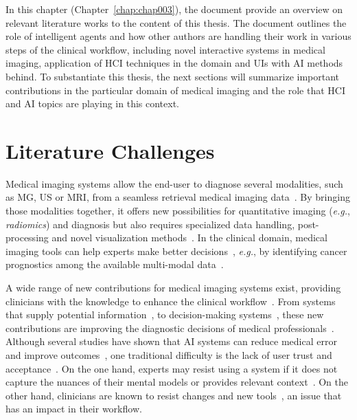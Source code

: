 \clearpage
\label{chap:chap003}

In this chapter (Chapter~\ref{chap:chap003}), the document provide an overview on relevant literature works to the content of this thesis.
The document outlines the role of intelligent agents and how other authors are handling their work in various steps of the clinical workflow, including novel interactive systems in medical imaging, application of \ac{HCI} techniques in the domain and \acp{UI} with \ac{AI} methods behind.
To substantiate this thesis, the next sections will summarize important contributions in the particular domain of medical imaging and the role that \ac{HCI} and \ac{AI} topics are playing in this context.

\section{Literature Challenges}
\label{sec:sec003001}

Medical imaging systems allow the end-user to diagnose several modalities, such as \ac{MG}, \ac{US} or \ac{MRI}, from a seamless retrieval medical imaging data~\cite{faraji2019radiologic, seifabadi2019correlation}.
By bringing those modalities together, it offers new possibilities for quantitative imaging ({\it e.g.}, {\it radiomics}) and diagnosis but also requires specialized data handling, post-processing and novel visualization methods~\cite{Igarashi:2016:IVS:2984511.2984537, Ocegueda-Hernandez:2016:CMN:2876456.2879485, Sousa:2017:VVR:3025453.3025566}.
In the clinical domain, medical imaging tools can help experts make better decisions~\cite{Lopes:2017:UHC:3143820.3144118}, {\it e.g.}, by identifying cancer prognostics among the available multi-modal data~\cite{lopes2018interaction}.

A wide range of new contributions for medical imaging systems exist, providing clinicians with the knowledge to enhance the clinical workflow~\cite{Cai:2019:HTC:3290605.3300234, edge2019clinical}.
From systems that supply potential information~\cite{10.1145/3399715.3399744, 10.1145/3206505.3206555}, to decision-making systems~\cite{10.1145/3290605.3300468, 10.1145/3359206}, these new contributions are improving the diagnostic decisions of medical professionals~\cite{hwang2019artificial}.
Although several studies have shown that \ac{AI} systems can reduce medical error and improve outcomes~\cite{Cai:2019:HTC:3290605.3300234, Cai:2019:EEE:3301275.3302289}, one traditional difficulty is the lack of user trust and acceptance~\cite{https://doi.org/10.1002/mp.13562}.
On the one hand, experts may resist using a system if it does not capture the nuances of their mental models or provides relevant context~\cite{khairat2018reasons, kohli2018cad, yang2016investigating}.
On the other hand, clinicians are known to resist changes and new tools~\cite{10.1145/3132272.3134111, gagnon2014electronic}, an issue that has an impact in their workflow.

